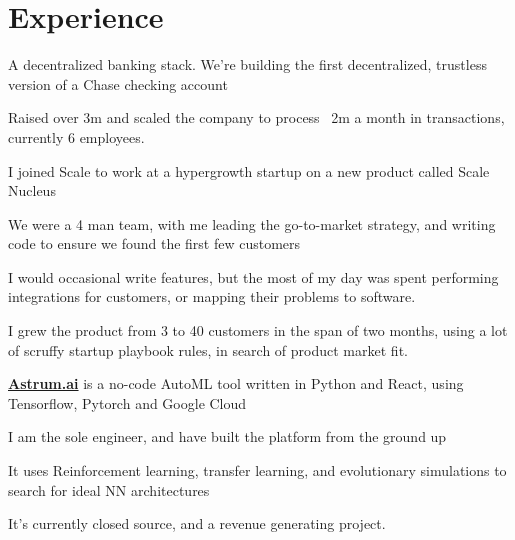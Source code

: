 \documentclass[]{deedy-resume-openfont}
\begin{document}
\begin{minipage}[t]{0.66\textwidth} 


\section{Experience}

\vspace{\topsep} %
\begin{tightemize}
\item A decentralized banking stack. We're building the first decentralized, trustless version of a Chase checking account
\item Raised over 3m and scaled the company to process ~2m a month in transactions, currently 6 employees.
\end{tightemize}
\sectionsep

\vspace{\topsep} %
\begin{tightemize}
\item I joined Scale to work at a hypergrowth startup on a new product called Scale Nucleus
\item We were a 4 man team, with me leading the go-to-market strategy, and writing code to ensure we found the first few customers
\item I would occasional write features, but the most of my day was spent performing integrations for customers, or mapping their problems to software.
\item I grew the product from 3 to 40 customers in the span of two months, using a lot of scruffy startup playbook rules, in search of product market fit.
\end{tightemize}
\sectionsep

\vspace{\topsep} %
\begin{tightemize}
\item \textbf{\href{https://www.astrum.ai}{Astrum.ai}} is a no-code AutoML tool written in Python and React, using Tensorflow, Pytorch and Google Cloud
\item I am the sole engineer, and have built the platform from the ground up
\item It uses Reinforcement learning, transfer learning, and evolutionary simulations to search for ideal NN architectures
\item It's currently closed source, and a revenue generating project.
\end{tightemize}
\sectionsep


\end{minipage}
\end{document}
